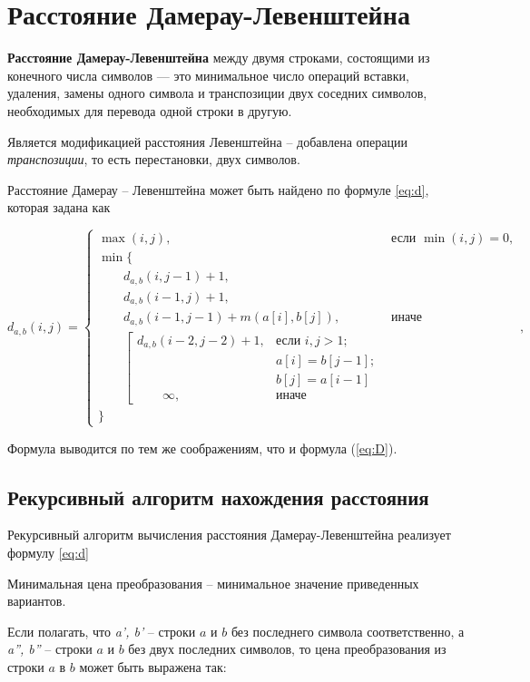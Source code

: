\section{Расстояние Дамерау-Левенштейна}

\textbf{Расстояние Дамерау-Левенштейна} \cite{damerau-levenshtein} между двумя строками, состоящими из конечного числа символов — это минимальное число операций вставки, удаления, замены одного символа и транспозиции двух соседних символов, необходимых для перевода одной строки в другую.

Является модификацией расстояния Левенштейна -- добавлена операции \textit{транспозиции}, то есть перестановки, двух символов.

Расстояние Дамерау -- Левенштейна может быть найдено по формуле \ref{eq:d}, которая задана как


\begin{equation}
	\label{eq:d}
	d_{a,b}(i, j) = \begin{cases}
		\max(i, j), &\text{если }\min(i, j) = 0,\\
		\min \lbrace \\
			\qquad d_{a,b}(i, j-1) + 1,\\
			\qquad d_{a,b}(i-1, j) + 1,\\
			\qquad d_{a,b}(i-1, j-1) + m(a[i], b[j]), &\text{иначе}\\
			\qquad \left[ \begin{array}{cc}d_{a,b}(i-2, j-2) + 1, &\text{если }i,j > 1;\\
			\qquad &\text{}a[i] = b[j-1]; \\
			\qquad &\text{}b[j] = a[i-1]\\
			\qquad \infty, & \text{иначе}\end{array}\right.\\
		\rbrace
		\end{cases},
\end{equation}

Формула выводится по тем же соображениям, что и формула (\ref{eq:D}).

\subsection{Рекурсивный алгоритм нахождения расстояния}
Рекурсивный алгоритм вычисления расстояния Дамерау-Левенштейна реализует формулу \ref{eq:d}

Минимальная цена преобразования -- минимальное значение приведенных вариантов.

Если полагать, что \textit{a', b'} -- строки $a$ и $b$ без последнего символа соответственно, а \textit{a'', b''} -- строки $a$ и $b$ без двух последних символов, то цена преобразования из строки $a$ в $b$ может быть выражена так:

